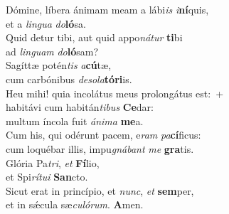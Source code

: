 \evenverse Dómine, líbera ánimam meam a lábi\textit{is} \textit{i}\textbf{ní}quis,~\*\\
\evenverse et a \textit{lin}\textit{gua} \textit{do}\textbf{ló}sa.\\
\oddverse Quid detur tibi, aut quid appo\textit{ná}\textit{tur} \textbf{ti}bi~\*\\
\oddverse ad \textit{lin}\textit{guam} \textit{do}\textbf{ló}sam?\\
\evenverse Sagíttæ potén\textit{tis} \textit{a}\textbf{cú}tæ,~\*\\
\evenverse cum carbónibus \textit{de}\textit{so}\textit{la}\textbf{tó}\textbf{ri}is.\\
\oddverse Heu mihi! quia incolátus meus prolongátus est:~+\\
\oddverse  habitávi cum habitán\textit{ti}\textit{bus} \textbf{Ce}dar:~\*\\
\oddverse multum íncola fuit \textit{á}\textit{ni}\textit{ma} \textbf{me}a.\\
\evenverse Cum his, qui odérunt pacem, e\textit{ram} \textit{pa}\textbf{cí}ficus:~\*\\
\evenverse cum loquébar illis, impu\textit{gná}\textit{bant} \textit{me} \textbf{gra}tis.\\
\oddverse Glória Pa\textit{tri}, \textit{et} \textbf{Fí}lio,~\*\\
\oddverse et Spi\textit{rí}\textit{tu}\textit{i} \textbf{San}cto.\\
\evenverse Sicut erat in princípio, et \textit{nunc}, \textit{et} \textbf{sem}per,~\*\\
\evenverse et in sǽcula sæ\textit{cu}\textit{ló}\textit{rum}. \textbf{A}men.\\
